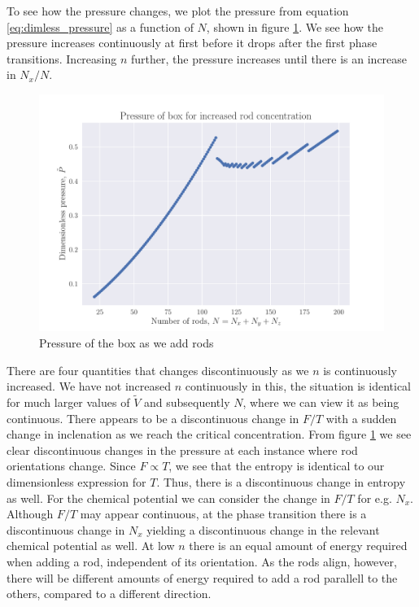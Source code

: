 \documentclass[reprint,english,notitlepage,aps,nobalancelastpage,nofootinbib]{revtex4-1}
\newcommand{\nx}{N_x}
\newcommand{\V}{\tilde{V}}
\begin{document}
To see how the pressure changes, we plot the pressure from equation \eqref{eq:dimless_pressure} as a function of $N$, shown in figure \ref{fig:F_P}. We see how the pressure increases continuously at first before it drops after the first phase transitions. Increasing $n$ further, the pressure increases until there is an increase in $\nx/N$. 


\begin{figure}[h!]
	\centering
	\includegraphics[width=0.8\linewidth]{helmholtz_pressure.pdf}
	\caption{Pressure of the box as we add rods}
	\label{fig:F_P}
\end{figure}

There are four quantities that changes discontinuously as we $n$ is continuously increased. We have not increased $n$ continuously in this, the situation is identical for much larger values of $\V$ and subsequently $N$, where we can view it as being continuous. There appears to be a  discontinuous change in $F/T$ with a sudden change in inclenation as we reach the critical concentration. From figure \ref{fig:F_P} we see clear discontinuous changes in the pressure at each instance where rod orientations change. Since $F\propto T$, we see that the entropy is identical to our dimensionless expression for $T$. Thus, there is a discontinuous change in entropy as well. For the chemical potential we can consider the change in $F/T$ for e.g. $\nx$. Although $F/T$ may appear continuous, at the phase transition there is a discontinuous change in $N_x$ yielding a discontinuous change in the relevant chemical potential as well. At low $n$ there is an equal amount of energy required when adding a rod, independent of its orientation. As the rods align, however, there will be different amounts of energy required to add a rod parallell to the others, compared to a different direction.   
\end{document}
